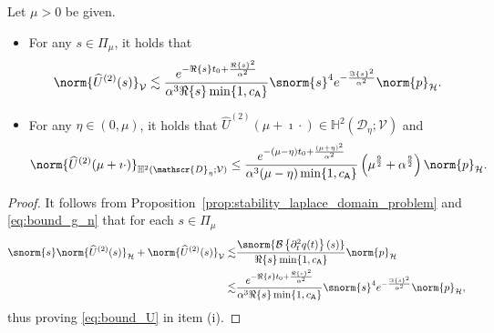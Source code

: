 \begin{lemma}\label{lmm:regularity_U_n}
Let $\mu >0$ be given. 
\begin{itemize}
\item[(i)]
For any $s \in \Pi_{\mu}$, it holds that
\begin{align}\label{eq:bound_U}
	\norm{
		\widehat{U}^{(2)}(s)
	}_\mathcal{V}
    \lesssim
    \frac{e^{-\Re\{s\} t_0+\frac{\Re\{s\}^2}{\alpha^2}}}{\alpha^3 \Re\{s\}
    \min\{1, c_{\mathsf{A}}\}}
    \snorm{s}^{4}
	e^{-\frac{\Im\{s\}^2}{\alpha^2}}
	\norm{p}_\mathcal{H}.
\end{align}
\item[(ii)] For any $\eta \in (0,{\mu})$, it holds that
$\widehat{U}^{(2)}(\mu + \imath \cdot) \in \mathbb{H}^2(\mathscr{D}_\eta;\mathcal{V})$
and
\begin{align}
	\norm{
		\widehat{U}^{(2)}(\mu + \imath \cdot)
	}_{\mathbb{H}^2(\mathscr{D}_\eta;\mathcal{V})}
    \leq
    \frac{e^{-(\mu-\eta) t_0+\frac{(\mu+\eta)^2}{\alpha^2}}}{\alpha^3(\mu-\eta) \min\{1, c_{\mathsf{A}}\}}
    \left(
		\mu^\frac{9}{2}
		+
		\alpha^\frac{9}{2}
    \right)
    \norm{p}_\mathcal{H}.
\end{align}
\end{itemize}
\end{lemma}

\begin{proof}
It follows from Proposition~\ref{prop:stability_laplace_domain_problem} 
and \eqref{eq:bound_g_n} that for each $s \in \Pi_\mu$
\begin{equation}\label{eq:bound_Laplace_V_s}
\begin{aligned}
	\snorm{s}
	\norm{
		\widehat{U}^{(2)}(s)
	}_\mathcal{H}
	+
	\norm{
		\widehat{U}^{(2)}(s)
	}_\mathcal{V}
	\lesssim
	&
	\frac{
	\snorm{\mathcal{B}
	\left\{
		\partial^2_t  q (t)
	\right\}(s)}
	}{{\Re\{s\}} \min\{1, c_{\mathsf{A}}\}}
	\norm{p}_\mathcal{H}
	\\
	\lesssim
	&
	\frac{e^{-\Re\{s\} t_0+ \frac{\Re\{s\}^2}{\alpha^2}}}{\alpha^3 {\Re\{s\}} \min\{1, c_{\mathsf{A}}\}} 
	\snorm{s}^{4}
	e^{-\frac{\Im\{s\}^2}{\alpha^2}}
	\norm{p}_\mathcal{H},
\end{aligned}
\end{equation}
thus proving \eqref{eq:bound_U} in item (i).
\end{proof}

